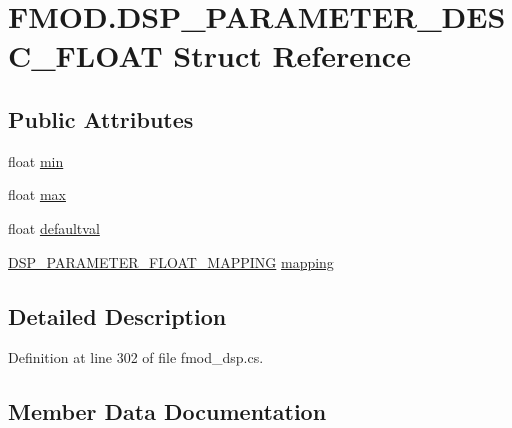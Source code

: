 \hypertarget{struct_f_m_o_d_1_1_d_s_p___p_a_r_a_m_e_t_e_r___d_e_s_c___f_l_o_a_t}{}\section{F\+M\+O\+D.\+D\+S\+P\+\_\+\+P\+A\+R\+A\+M\+E\+T\+E\+R\+\_\+\+D\+E\+S\+C\+\_\+\+F\+L\+O\+AT Struct Reference}
\label{struct_f_m_o_d_1_1_d_s_p___p_a_r_a_m_e_t_e_r___d_e_s_c___f_l_o_a_t}
\subsection*{Public Attributes}
\begin{DoxyCompactItemize}
\item 
float \hyperlink{struct_f_m_o_d_1_1_d_s_p___p_a_r_a_m_e_t_e_r___d_e_s_c___f_l_o_a_t_a4cc282249844dbf2fdfda7e5c69c1e73}{min}
\item 
float \hyperlink{struct_f_m_o_d_1_1_d_s_p___p_a_r_a_m_e_t_e_r___d_e_s_c___f_l_o_a_t_a7662a58ff1b6b72e3a13e35c168d34e7}{max}
\item 
float \hyperlink{struct_f_m_o_d_1_1_d_s_p___p_a_r_a_m_e_t_e_r___d_e_s_c___f_l_o_a_t_a6476dcd1f851746fcb32a4958feb8d8b}{defaultval}
\item 
\hyperlink{struct_f_m_o_d_1_1_d_s_p___p_a_r_a_m_e_t_e_r___f_l_o_a_t___m_a_p_p_i_n_g}{D\+S\+P\+\_\+\+P\+A\+R\+A\+M\+E\+T\+E\+R\+\_\+\+F\+L\+O\+A\+T\+\_\+\+M\+A\+P\+P\+I\+NG} \hyperlink{struct_f_m_o_d_1_1_d_s_p___p_a_r_a_m_e_t_e_r___d_e_s_c___f_l_o_a_t_aa0b34ab721920f7596d685b00726d1bd}{mapping}
\end{DoxyCompactItemize}


\subsection{Detailed Description}


Definition at line 302 of file fmod\+\_\+dsp.\+cs.



\subsection{Member Data Documentation}
\mbox{\label{struct_f_m_o_d_1_1_d_s_p___p_a_r_a_m_e_t_e_r___d_e_s_c___f_l_o_a_t_a6476dcd1f851746fcb32a4958feb8d8b}} 
